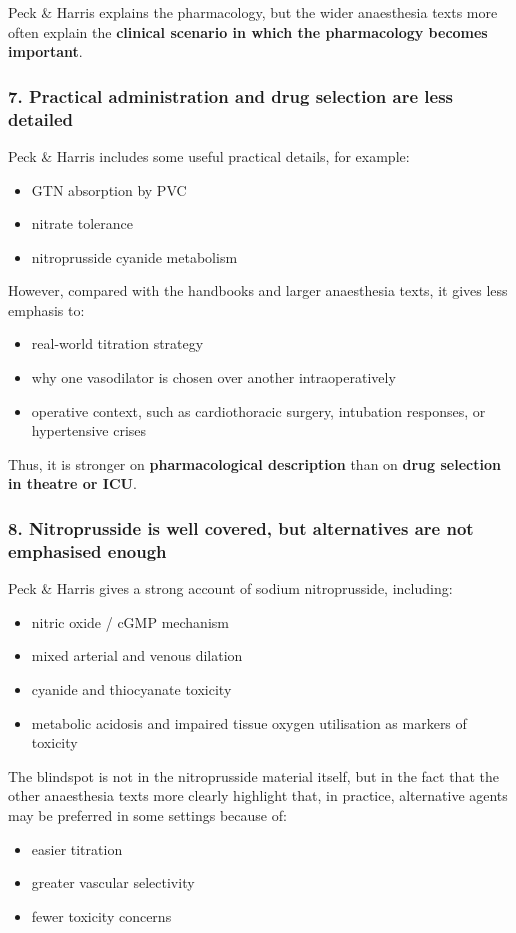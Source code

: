 \documentclass[11pt,a4paper]{article}
\begin{document}
Peck \& Harris explains the pharmacology, but the wider anaesthesia texts more often explain the \textbf{clinical scenario in which the pharmacology becomes important}.

\subsubsection*{7. Practical administration and drug selection are less detailed}
Peck \& Harris includes some useful practical details, for example:
\begin{itemize}
    \item GTN absorption by PVC
    \item nitrate tolerance
    \item nitroprusside cyanide metabolism
\end{itemize}

However, compared with the handbooks and larger anaesthesia texts, it gives less emphasis to:
\begin{itemize}
    \item real-world titration strategy
    \item why one vasodilator is chosen over another intraoperatively
    \item operative context, such as cardiothoracic surgery, intubation responses, or hypertensive crises
\end{itemize}

Thus, it is stronger on \textbf{pharmacological description} than on \textbf{drug selection in theatre or ICU}.

\subsubsection*{8. Nitroprusside is well covered, but alternatives are not emphasised enough}
Peck \& Harris gives a strong account of sodium nitroprusside, including:
\begin{itemize}
    \item nitric oxide / cGMP mechanism
    \item mixed arterial and venous dilation
    \item cyanide and thiocyanate toxicity
    \item metabolic acidosis and impaired tissue oxygen utilisation as markers of toxicity
\end{itemize}

The blindspot is not in the nitroprusside material itself, but in the fact that the other anaesthesia texts more clearly highlight that, in practice, alternative agents may be preferred in some settings because of:
\begin{itemize}
    \item easier titration
    \item greater vascular selectivity
    \item fewer toxicity concerns
\end{itemize}
\end{document}
